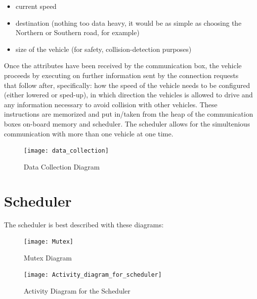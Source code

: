 \documentclass[conference]{IEEEtran}
\begin{document}
\begin{itemize}
	\item current speed
	\item destination (nothing too data heavy, it would be as simple as choosing the Northern or Southern road, for example)
	\item size of the vehicle (for safety, collision-detection purposes)
\end{itemize} 
Once the attributes have been received by the communication box, the vehicle proceeds by executing on further information sent by the connection requests that follow after, specifically: how the speed of the vehicle needs to be configured (either lowered or sped-up), in which direction the vehicles is allowed to drive and any information necessary to avoid collision with other vehicles. These instructions are memorized and put in/taken from the heap of the communication boxes on-board memory and scheduler. The scheduler allows for the simultenious communication with more than one vehicle at one time.
\begin{figure}[h!]
	\texttt{[image: data\_collection]}
	\caption{Data Collection Diagram}
	\centering
\end{figure}
\section{Scheduler}
 The scheduler is best described with these diagrams: 
 \begin{figure}[h!]
 	\texttt{[image: Mutex]}
 	\caption{Mutex Diagram}
 	\centering
 \end{figure}
 \begin{figure}[h!]
	\texttt{[image: Activity\_diagram\_for\_scheduler]}
	\caption{Activity Diagram for the Scheduler}
	\centering
\end{figure}
\end{document}
